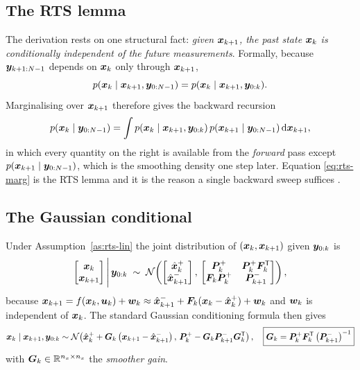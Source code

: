\subsection{The RTS lemma}
The derivation rests on one structural fact: \emph{given $\bm{x}_{k+1}$, the past state $\bm{x}_k$ is
conditionally independent of the future measurements}.  Formally, because
$\bm{y}_{k+1:N-1}$ depends on $\bm{x}_k$ only through $\bm{x}_{k+1}$,
\begin{equation}
p(\bm{x}_k\mid\bm{x}_{k+1},\bm{y}_{0:N-1})=p(\bm{x}_k\mid\bm{x}_{k+1},\bm{y}_{0:k}).
\label{eq:rts-lemma}
\end{equation}
Marginalising over $\bm{x}_{k+1}$ therefore gives the backward recursion
\begin{equation}
p(\bm{x}_k\mid\bm{y}_{0:N-1})=\int p(\bm{x}_k\mid\bm{x}_{k+1},\bm{y}_{0:k})\,p(\bm{x}_{k+1}\mid\bm{y}_{0:N-1})\,\mathrm{d}\bm{x}_{k+1},
\label{eq:rts-marg}
\end{equation}
in which every quantity on the right is available from the \emph{forward} pass except
$p(\bm{x}_{k+1}\mid\bm{y}_{0:N-1})$, which is the smoothing density one step later.  Equation
\eqref{eq:rts-marg} is the RTS lemma and it is the reason a single backward sweep suffices
\cite[§8.1]{sarkka2013}.

\subsection{The Gaussian conditional}
Under Assumption~\ref{as:rts-lin} the joint distribution of $(\bm{x}_k,\bm{x}_{k+1})$ given $\bm{y}_{0:k}$ is
\begin{equation}
\begin{bmatrix}\bm{x}_k\\ \bm{x}_{k+1}\end{bmatrix}\Bigg|\,\bm{y}_{0:k}
\;\sim\;
\mathcal{N}\!\left(\begin{bmatrix}\hat{\bm{x}}^{+}_k\\ \hat{\bm{x}}^{-}_{k+1}\end{bmatrix},\,\begin{bmatrix}\bm{P}^+_k & \bm{P}^+_k\bm{F}_k^{\mathsf{T}}\\ \bm{F}_k\bm{P}^+_k & \bm{P}^-_{k+1}\end{bmatrix}\right) ,
\label{eq:rts-joint}
\end{equation}
because $\bm{x}_{k+1}=f(\bm{x}_k,\bm{u}_k)+\bm{w}_k\approx \hat{\bm{x}}^{-}_{k+1}+\bm{F}_k(\bm{x}_k-\hat{\bm{x}}^{+}_k)+\bm{w}_k$ and
$\bm{w}_k$ is independent of $\bm{x}_k$.  The standard Gaussian conditioning formula then gives
\begin{equation}
\bm{x}_k\mid\bm{x}_{k+1},\bm{y}_{0:k}\sim\mathcal{N}\!\left(\hat{\bm{x}}^{+}_k+\bm{G}_k\left(\bm{x}_{k+1}-\hat{\bm{x}}^{-}_{k+1}\right),\,\bm{P}^+_k-\bm{G}_k\bm{P}^-_{k+1}\bm{G}_k^{\mathsf{T}}\right),
\quad
\boxed{\bm{G}_k=\bm{P}^+_k\bm{F}_k^{\mathsf{T}}\left(\bm{P}^-_{k+1}\right)^{-1}}
\label{eq:rts-gain}
\end{equation}
with $\bm{G}_k\in\mathbb{R}^{n_x\times n_x}$ the \emph{smoother gain}.


